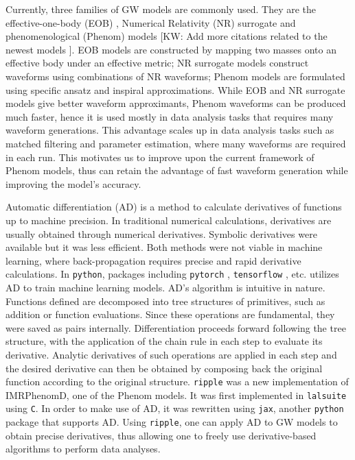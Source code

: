 \documentclass[twocolumn]{aastex631}
\newcommand{\ripple}{\texttt{ripple}}
\newcommand{\python}{\texttt{python}}
\newcommand{\jax}{\texttt{jax}}
\newcommand{\kw}[1]{{\color{rb4}[KW: #1 ]}}
\begin{document}
Currently, three families of GW models are commonly used. They are the
effective-one-body (EOB) \citep{taracchini2014effective}, Numerical Relativity
(NR) surrogate \citep{varma2019surrogate} and phenomenological (Phenom) models
\citep{husa2016frequency,khan2016frequency} \kw{Add more citations related to
the newest models}. EOB models are constructed by mapping two masses onto an
effective body under an effective metric; NR surrogate models construct
waveforms using combinations of NR waveforms; Phenom models are formulated using
specific ansatz and inspiral approximations. While EOB and NR surrogate models
give better waveform approximants, Phenom waveforms can be produced much faster,
hence it is used mostly in data analysis tasks that requires many waveform
generations. This advantage scales up in data analysis tasks such as matched
filtering and parameter estimation, where many waveforms are required in each
run. This motivates us to improve upon the current framework of Phenom models,
thus can retain the advantage of fast waveform generation while improving the
model's accuracy. 

Automatic differentiation (AD) is a method to calculate derivatives of functions
up to machine precision. In traditional numerical calculations, derivatives are
usually obtained through numerical derivatives. Symbolic derivatives were
available but it was less efficient. Both methods were not viable in machine
learning, where back-propagation requires precise and rapid derivative
calculations. In {\python}, packages including \texttt{pytorch} \citep{pytorch},
\texttt{tensorflow} \citep{tensorflow2015-whitepaper}, etc. utilizes AD to train
machine learning models. AD's algorithm is intuitive in nature. Functions
defined are decomposed into tree structures of primitives, such as addition or
function evaluations. Since these operations are fundamental, they were saved as
pairs internally. Differentiation proceeds forward following the tree structure,
with the application of the chain rule in each step to evaluate its derivative.
Analytic derivatives of such operations are applied in each step and the desired
derivative can then be obtained by composing back the original function
according to the original structure. {\ripple} \citep{ripple} was a new
implementation of IMRPhenomD, one of the Phenom models. It was first implemented
in \texttt{lalsuite} using \texttt{C}. In order to make use of AD, it was
rewritten using \jax, another {\python} package that supports AD. Using
{\ripple}, one can apply AD to GW models to obtain precise derivatives, thus
allowing one to freely use derivative-based algorithms to perform data analyses. 
\end{document}
